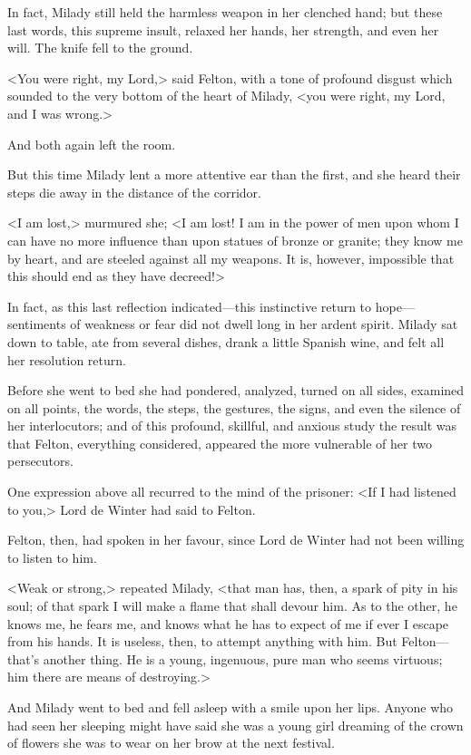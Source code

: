 In fact, Milady still held the harmless weapon in her clenched hand; but these last words, this supreme insult, relaxed her hands, her strength, and even her will. The knife fell to the ground. 

<You were right, my Lord,> said Felton, with a tone of profound disgust which sounded to the very bottom of the heart of Milady, <you were right, my Lord, and I was wrong.> 

And both again left the room. 

But this time Milady lent a more attentive ear than the first, and she heard their steps die away in the distance of the corridor. 

<I am lost,> murmured she; <I am lost! I am in the power of men upon whom I can have no more influence than upon statues of bronze or granite; they know me by heart, and are steeled against all my weapons. It is, however, impossible that this should end as they have decreed!> 

In fact, as this last reflection indicated---this instinctive return to hope---sentiments of weakness or fear did not dwell long in her ardent spirit. Milady sat down to table, ate from several dishes, drank a little Spanish wine, and felt all her resolution return. 

Before she went to bed she had pondered, analyzed, turned on all sides, examined on all points, the words, the steps, the gestures, the signs, and even the silence of her interlocutors; and of this profound, skillful, and anxious study the result was that Felton, everything considered, appeared the more vulnerable of her two persecutors. 

One expression above all recurred to the mind of the prisoner: <If I had listened to you,> Lord de Winter had said to Felton. 

Felton, then, had spoken in her favour, since Lord de Winter had not been willing to listen to him. 

<Weak or strong,> repeated Milady, <that man has, then, a spark of pity in his soul; of that spark I will make a flame that shall devour him. As to the other, he knows me, he fears me, and knows what he has to expect of me if ever I escape from his hands. It is useless, then, to attempt anything with him. But Felton---that's another thing. He is a young, ingenuous, pure man who seems virtuous; him there are means of destroying.> 

And Milady went to bed and fell asleep with a smile upon her lips. Anyone who had seen her sleeping might have said she was a young girl dreaming of the crown of flowers she was to wear on her brow at the next festival.